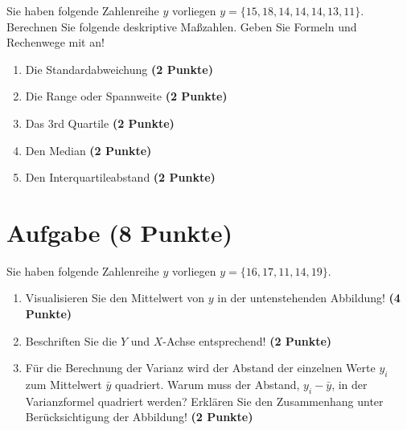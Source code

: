 \documentclass[a4paper, 10pt]{scrartcl}\usepackage[]{graphicx}\usepackage[]{xcolor}
\begin{document}
Sie haben folgende Zahlenreihe $y$ vorliegen
$y = \{15, 18, 14, 14, 14, 13, 11\}$. Berechnen Sie folgende
deskriptive Ma{\ss}zahlen. Geben Sie Formeln und Rechenwege mit an!



\begin{enumerate}
\item Die Standardabweichung \textbf{(2 Punkte)}
\item Die Range oder Spannweite \textbf{(2 Punkte)}
\item Das 3rd Quartile \textbf{(2 Punkte)}
\item Den Median \textbf{(2 Punkte)}
\item Den Interquartileabstand \textbf{(2 Punkte)}
\end{enumerate}
 
\clearpage

\section{Aufgabe \hfill (8 Punkte)}

Sie haben folgende Zahlenreihe $y$ vorliegen
$y = \{16, 17, 11, 14, 19\}$.

\begin{enumerate}
\item Visualisieren Sie den Mittelwert von $y$ in der untenstehenden
  Abbildung! \textbf{(4 Punkte)}
\item Beschriften Sie die $Y$ und $X$-Achse entsprechend! \textbf{(2 Punkte)}
\item F{\"u}r die Berechnung der Varianz wird der Abstand der einzelnen Werte $y_i$
  zum Mittelwert $\bar{y}$ quadriert. Warum muss der Abstand, $y_i -
  \bar{y}$, in der Varianzformel quadriert werden?
  Erkl{\"a}ren Sie den Zusammenhang unter Ber{\"u}cksichtigung der Abbildung!
  \textbf{(2 Punkte)}  
\end{enumerate}
\end{document}
